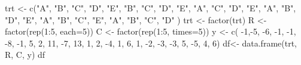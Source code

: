 \documentclass[
]{book}
\newenvironment{Shaded}{\begin{snugshade}}{\end{snugshade}}
\newcommand{\AttributeTok}[1]{\textcolor[rgb]{0.77,0.63,0.00}{#1}}
\newcommand{\DecValTok}[1]{\textcolor[rgb]{0.00,0.00,0.81}{#1}}
\newcommand{\FunctionTok}[1]{\textcolor[rgb]{0.00,0.00,0.00}{#1}}
\newcommand{\NormalTok}[1]{#1}
\newcommand{\OtherTok}[1]{\textcolor[rgb]{0.56,0.35,0.01}{#1}}
\newcommand{\SpecialCharTok}[1]{\textcolor[rgb]{0.00,0.00,0.00}{#1}}
\newcommand{\StringTok}[1]{\textcolor[rgb]{0.31,0.60,0.02}{#1}}
\begin{document}
\begin{Shaded}
\begin{Highlighting}[]
\NormalTok{trt }\OtherTok{\textless{}{-}} \FunctionTok{c}\NormalTok{(}\StringTok{"A"}\NormalTok{, }\StringTok{"B"}\NormalTok{, }\StringTok{"C"}\NormalTok{, }\StringTok{"D"}\NormalTok{, }\StringTok{"E"}\NormalTok{,}
         \StringTok{"B"}\NormalTok{, }\StringTok{"C"}\NormalTok{, }\StringTok{"D"}\NormalTok{, }\StringTok{"E"}\NormalTok{, }\StringTok{"A"}\NormalTok{,}
         \StringTok{"C"}\NormalTok{, }\StringTok{"D"}\NormalTok{, }\StringTok{"E"}\NormalTok{, }\StringTok{"A"}\NormalTok{, }\StringTok{"B"}\NormalTok{,}
         \StringTok{"D"}\NormalTok{, }\StringTok{"E"}\NormalTok{, }\StringTok{"A"}\NormalTok{, }\StringTok{"B"}\NormalTok{, }\StringTok{"C"}\NormalTok{,}
         \StringTok{"E"}\NormalTok{, }\StringTok{"A"}\NormalTok{, }\StringTok{"B"}\NormalTok{, }\StringTok{"C"}\NormalTok{, }\StringTok{"D"}\NormalTok{ )}
\NormalTok{trt }\OtherTok{\textless{}{-}} \FunctionTok{factor}\NormalTok{(trt)}
\NormalTok{R }\OtherTok{\textless{}{-}} \FunctionTok{factor}\NormalTok{(}\FunctionTok{rep}\NormalTok{(}\DecValTok{1}\SpecialCharTok{:}\DecValTok{5}\NormalTok{, }\AttributeTok{each=}\DecValTok{5}\NormalTok{))}
\NormalTok{C }\OtherTok{\textless{}{-}} \FunctionTok{factor}\NormalTok{(}\FunctionTok{rep}\NormalTok{(}\DecValTok{1}\SpecialCharTok{:}\DecValTok{5}\NormalTok{, }\AttributeTok{times=}\DecValTok{5}\NormalTok{))}
\NormalTok{y }\OtherTok{\textless{}{-}} \FunctionTok{c}\NormalTok{( }\SpecialCharTok{{-}}\DecValTok{1}\NormalTok{,}\SpecialCharTok{{-}}\DecValTok{5}\NormalTok{, }\SpecialCharTok{{-}}\DecValTok{6}\NormalTok{, }\SpecialCharTok{{-}}\DecValTok{1}\NormalTok{, }\SpecialCharTok{{-}}\DecValTok{1}\NormalTok{,}
        \SpecialCharTok{{-}}\DecValTok{8}\NormalTok{, }\SpecialCharTok{{-}}\DecValTok{1}\NormalTok{, }\DecValTok{5}\NormalTok{, }\DecValTok{2}\NormalTok{, }\DecValTok{11}\NormalTok{,}
        \SpecialCharTok{{-}}\DecValTok{7}\NormalTok{, }\DecValTok{13}\NormalTok{, }\DecValTok{1}\NormalTok{, }\DecValTok{2}\NormalTok{, }\SpecialCharTok{{-}}\DecValTok{4}\NormalTok{,}
        \DecValTok{1}\NormalTok{, }\DecValTok{6}\NormalTok{, }\DecValTok{1}\NormalTok{, }\SpecialCharTok{{-}}\DecValTok{2}\NormalTok{, }\SpecialCharTok{{-}}\DecValTok{3}\NormalTok{,}
        \SpecialCharTok{{-}}\DecValTok{3}\NormalTok{, }\DecValTok{5}\NormalTok{, }\SpecialCharTok{{-}}\DecValTok{5}\NormalTok{, }\DecValTok{4}\NormalTok{, }\DecValTok{6}\NormalTok{)}
\NormalTok{df}\OtherTok{\textless{}{-}} \FunctionTok{data.frame}\NormalTok{(trt, R, C, y)}
\NormalTok{df}
\end{Highlighting}
\end{Shaded}
\end{document}
